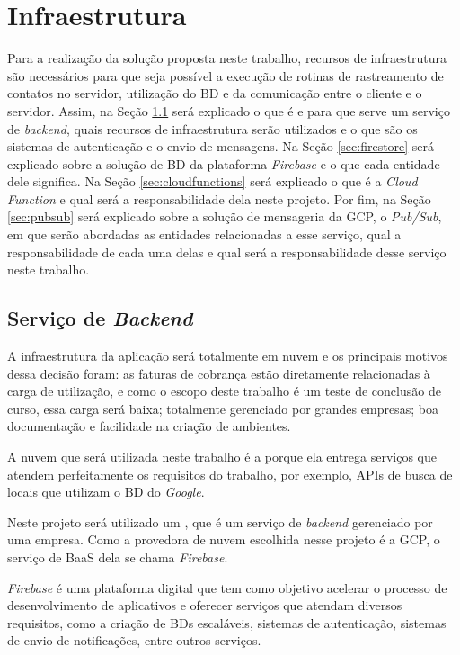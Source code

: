 \chapter{Infraestrutura}\label{chp:infraestrutura}

Para a realização da solução proposta neste trabalho, recursos de infraestrutura são necessários para que seja possível a execução de rotinas de rastreamento de contatos no servidor, utilização do BD e da comunicação entre o cliente e o servidor. Assim, na Seção \ref{sec:firebase} será explicado o que é e para que serve um serviço de \textit{backend}, quais recursos de infraestrutura serão utilizados e o que são os sistemas de autenticação e o envio de mensagens. Na Seção \ref{sec:firestore} será explicado sobre a solução de BD da plataforma \textit{Firebase} e o que cada entidade dele significa. Na Seção \ref{sec:cloudfunctions} será explicado o que é a \textit{Cloud Function} e qual será a responsabilidade dela neste projeto. Por fim, na Seção \ref{sec:pubsub} será explicado sobre a solução de mensageria da GCP, o \textit{Pub/Sub}, em que serão abordadas as entidades relacionadas a esse serviço, qual a responsabilidade de cada uma delas e qual será a responsabilidade desse serviço neste trabalho.

\section{Serviço de \textit{Backend}}\label{sec:firebase}

A infraestrutura da aplicação será totalmente em nuvem e os principais motivos dessa decisão foram: as faturas de cobrança estão diretamente relacionadas à carga de utilização, e como o escopo deste trabalho é um teste de conclusão de curso, essa carga será baixa; totalmente gerenciado por grandes empresas; boa documentação e facilidade na criação de ambientes.

A nuvem que será utilizada neste trabalho é a  porque ela entrega serviços que atendem perfeitamente os requisitos do trabalho, por exemplo, APIs de busca de locais que utilizam o BD do \textit{Google}.

Neste projeto será utilizado um , que é um serviço de \textit{backend} gerenciado por uma empresa. Como a provedora de nuvem escolhida nesse projeto é a GCP, o serviço de BaaS dela se chama \textit{Firebase}.

\textit{Firebase} é uma plataforma digital que tem como objetivo acelerar o processo de desenvolvimento de aplicativos e oferecer serviços que atendam diversos requisitos, como a criação de BDs escaláveis, sistemas de autenticação, sistemas de envio de notificações, entre outros serviços.


